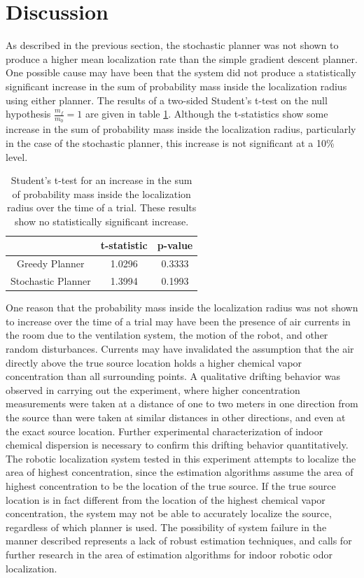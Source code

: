 \documentclass[submit, 12pt]{aiaa-pretty-modified}
\begin{document}
\section{Discussion}
As described in the previous section, the stochastic planner was not
shown to produce a higher mean localization
rate than the simple gradient descent planner.  One possible cause may
have been
that the system did not produce a statistically significant increase
in the sum of probability mass inside the localization radius using
either planner.  The results of a two-sided Student's t-test on the
null hypothesis $\frac{m_f}{m_0} = 1$ are given in table
\ref{tab:nofind}.  Although the t-statistics show some increase in the
sum of probability mass inside the localization radius,
particularly in the case of the stochastic planner, this increase is
not significant at a 10\% level.

\begin{table}[htb]
\begin{center}
\begin{tabular}{|c||c|c|}
\hline
& t-statistic & p-value \\
\hline \hline
Greedy Planner & 1.0296 & 0.3333\\
\hline
Stochastic Planner& 1.3994 &0.1993\\
\hline
\end{tabular}
\caption[Student's t-test on probability mass increase inside
localization radius.]{Student's t-test for an increase in the sum of probability
  mass inside the localization radius over the time of a trial.
  These results show no statistically significant increase. \label{tab:nofind} }
\end{center}
\end{table}


One reason that the probability mass inside the localization
radius was not shown to increase over the time of a trial may have been
the presence of air currents in the room due to the ventilation
system, the motion of the robot, and other random disturbances. Currents may have invalidated the
assumption that the air directly above the true source location
holds a higher chemical vapor concentration than all surrounding
points.  A qualitative drifting behavior was observed in carrying out
the experiment, where higher concentration measurements were taken
at a distance of one to two meters in one direction from the source than were
taken at similar distances in other directions, and even at the exact
source location.  Further experimental characterization of indoor
chemical dispersion is necessary to confirm this drifting
behavior quantitatively.  The robotic localization system tested in
this experiment attempts to localize the area of highest
concentration, since the estimation algorithms assume the area of highest
concentration to be the location of the true source.  If the true
source location is in fact different from the location of the
highest chemical vapor concentration, the system may not be able to accurately
localize the source, regardless of which planner is used.  The
possibility of system failure in the manner described represents a lack of robust estimation techniques, and
calls for further research in the area of estimation algorithms for
indoor robotic odor localization.
\end{document}
